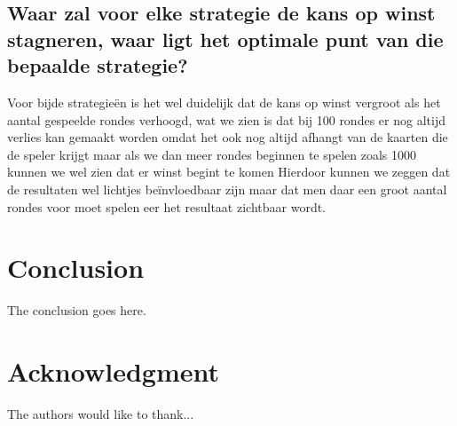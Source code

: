 \documentclass[conference]{IEEEtran}
\begin{document}
\subsection{ Waar zal voor elke strategie de kans op winst stagneren, waar ligt het optimale punt van die bepaalde strategie?}
Voor bijde strategieën is het wel duidelijk dat de kans op winst vergroot als het aantal gespeelde rondes verhoogd, wat we zien is dat bij 100 rondes er nog altijd verlies kan gemaakt worden omdat het ook nog altijd afhangt van de kaarten die de speler krijgt maar als we dan meer rondes beginnen te spelen zoals 1000 kunnen we wel zien dat er winst begint te komen Hierdoor kunnen we zeggen dat de resultaten wel lichtjes beïnvloedbaar zijn maar dat men daar een groot aantal rondes voor moet spelen eer het resultaat zichtbaar wordt. 
\section{Conclusion}
The conclusion goes here.

\section*{Acknowledgment}

The authors would like to thank...

\end{document}
